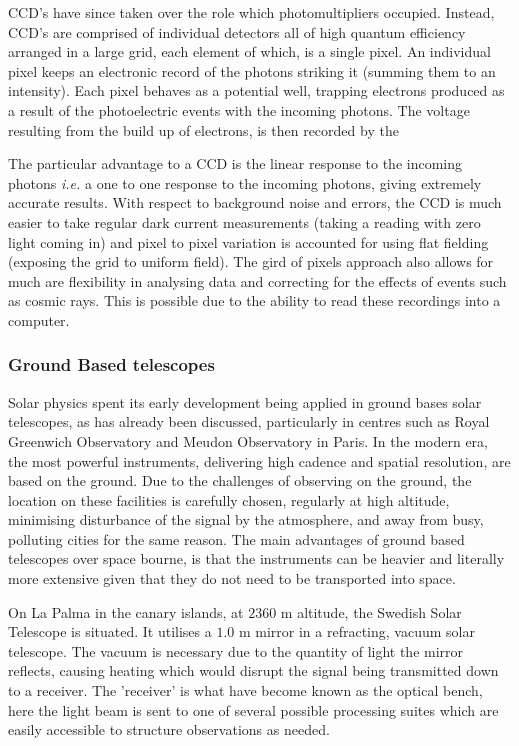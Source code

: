CCD's have since taken over the role which photomultipliers occupied.
Instead, CCD's are comprised of individual detectors all of high quantum efficiency arranged in a large grid, each element of which, is a single pixel.
An individual pixel keeps an electronic record of the photons striking it (summing them to an intensity).
Each pixel behaves as a potential well, trapping electrons produced as a result of the photoelectric events with the incoming photons.
The voltage resulting from the build up of electrons, is then recorded by the 

The particular advantage to a CCD is the linear response to the incoming photons \emph{i.e.} a one to one response to the incoming photons, giving extremely accurate results.
With respect to background noise and errors, the CCD is much easier to take regular dark current measurements (taking a reading with zero light coming in) and pixel to pixel variation is accounted for using flat fielding (exposing the grid to uniform field).
The gird of pixels approach also allows for much are flexibility in analysing data and correcting for the effects of events such as cosmic rays.
This is possible due to the ability to read these recordings into a computer.

\subsubsection{Ground Based telescopes}

Solar physics spent its early development being applied in ground bases solar telescopes, as has already been discussed, particularly in centres such as Royal Greenwich Observatory and Meudon Observatory in Paris.
In the modern era, the most powerful instruments, delivering high cadence and spatial resolution, are based on the ground.
Due to the challenges of observing on the ground, the location on these facilities is carefully chosen, regularly at high altitude, minimising disturbance of the signal by the atmosphere, and away from busy, polluting cities for the same reason.
The main advantages of ground based telescopes over space bourne, is that the instruments can be heavier and literally more extensive given that they do not need to be transported into space.

On La Palma in the canary islands, at $2360$ m altitude, the Swedish Solar Telescope is situated.
It utilises a $1.0$ m mirror in a refracting, vacuum solar telescope.
The vacuum is necessary due to the quantity of light the mirror reflects, causing heating which would disrupt the signal being transmitted down to a receiver.
The 'receiver' is what have become known as the optical bench, here the light beam is sent to one of several possible processing suites which are easily accessible to structure observations as needed.

